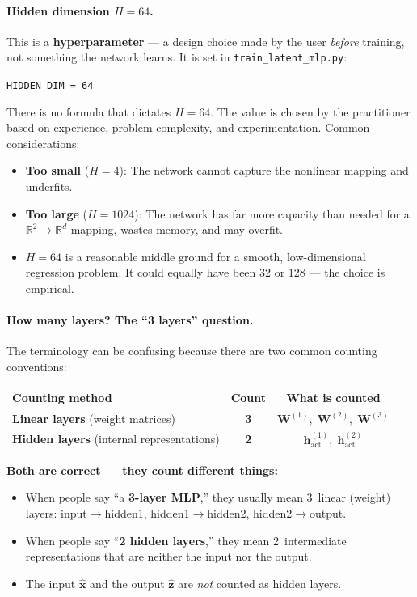 \documentclass[11pt,a4paper]{article}
\newcommand{\R}{\mathbb{R}}
\newcommand{\bz}{\mathbf{z}}
\newcommand{\bx}{\mathbf{x}}
\newcommand{\bW}{\mathbf{W}}
\newcommand{\bh}{\mathbf{h}}
\begin{document}
\paragraph{Hidden dimension $H = 64$.}
This is a \textbf{hyperparameter} --- a design choice made by the user
\emph{before} training, not something the network learns.  It is set in
\texttt{train\_latent\_mlp.py}:
\begin{center}
\texttt{HIDDEN\_DIM = 64}
\end{center}
There is no formula that dictates $H=64$.  The value is chosen by the
practitioner based on experience, problem complexity, and
experimentation. Common considerations:
\begin{itemize}[leftmargin=2em]
  \item \textbf{Too small} ($H=4$): The network cannot capture the
    nonlinear mapping and underfits.
  \item \textbf{Too large} ($H=1024$): The network has far more
    capacity than needed for a $\R^2 \to \R^d$ mapping, wastes memory,
    and may overfit.
  \item \textbf{$H=64$} is a reasonable middle ground for a smooth,
    low-dimensional regression problem.  It could equally have been 32
    or 128 --- the choice is empirical.
\end{itemize}

\paragraph{How many layers?  The ``3 layers'' question.}
The terminology can be confusing because there are two common counting
conventions:

\begin{table}[h]
\centering
\begin{tabular}{@{}lcc@{}}
\toprule
\textbf{Counting method} & \textbf{Count} & \textbf{What is counted} \\
\midrule
\textbf{Linear layers} (weight matrices) & \textbf{3} &
  $\bW^{(1)},\;\bW^{(2)},\;\bW^{(3)}$ \\
\textbf{Hidden layers} (internal representations) & \textbf{2} &
  $\bh^{(1)}_\text{act},\;\bh^{(2)}_\text{act}$ \\
\bottomrule
\end{tabular}
\end{table}

\noindent
\textbf{Both are correct --- they count different things:}
\begin{itemize}[leftmargin=2em]
  \item When people say ``a \textbf{3-layer MLP},'' they usually mean
    3~linear (weight) layers: input$\to$hidden1, hidden1$\to$hidden2,
    hidden2$\to$output.
  \item When people say ``\textbf{2 hidden layers},'' they mean
    2~intermediate representations that are neither the input nor the
    output.
  \item The input $\hat{\bx}$ and the output $\hat{\bz}$ are
    \emph{not} counted as hidden layers.
\end{itemize}
\end{document}
